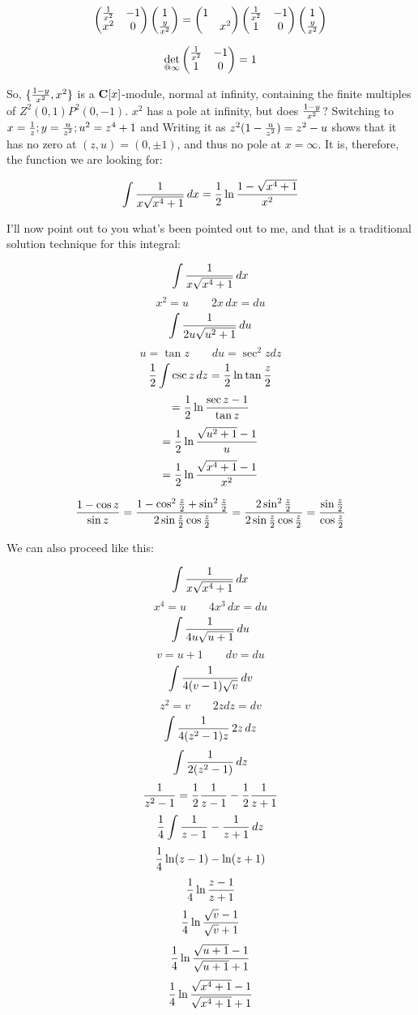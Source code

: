 $$\begin{pmatrix}
{1\over{x^2}} & -1 \cr
x^2 & 0\end{pmatrix} \begin{pmatrix}1 \cr {y\over{x^2}}\end{pmatrix} = \begin{pmatrix}1 & \cr & x^2\end{pmatrix}\begin{pmatrix}
{1\over{x^2}} & -1 \cr
1 & 0\end{pmatrix}
\begin{pmatrix}1 \cr {y\over{x^2}}\end{pmatrix} $$

$$\det_{@\infty}\begin{pmatrix}
{1\over{x^2}} & -1 \cr
1 & 0\end{pmatrix} = 1$$

So, $\{{{1-y}\over{x^2}}, x^2\}$ is a ${\bf C}[x]$-module, normal at
infinity, containing the finite multiples of $Z^2(0,1)P^2(0,-1)$.
$x^2$ has a pole at infinity, but does ${1-y}\over{x^2}$?
Switching to $x={1\over z}; y={u\over{z^2}}; u^2 = z^4 + 1$ and
Writing it as $z^2(1-{u\over{z^2}}) = z^2 - u$ shows that it has no
zero at $(z,u) = (0, \pm 1)$, and thus no pole at $x = \infty$.  It
is, therefore, the function we are looking for:

$$\int {1\over{x\sqrt{x^4+1}}} \, dx
   = {1\over2} \ln{{1-\sqrt{x^4+1}}\over{x^2}}$$

I'll now point out to you what's been pointed out to me, and that is a
traditional solution technique for this integral:

$$\int {1\over{x\sqrt{x^4+1}}} \, dx$$
$$x^2 = u \qquad 2 x\, dx = du$$
$$\int {1\over{2u\sqrt{u^2+1}}} \, du$$
$$u = \tan z \qquad du = \sec^2 z dz$$
$${1 \over 2} \int \csc z \, dz = {1\over 2} \ln \tan {z\over2}$$
$$={1\over2} \ln {{\sec z - 1}\over{\tan z}}$$
$$={1\over2} \ln {{\sqrt{u^2+1}-1}\over{u}}$$
$$={1\over2} \ln {{\sqrt{x^4+1}-1}\over{x^2}}$$

\vskip 0.5in

$${{1 - \cos z}\over{\sin z}} = {{1 - \cos^2 {z\over2} + \sin^2 {z\over2}}\over{2\sin{z\over2}\cos{z\over2}}} = {{2\sin^2 {z\over2}}\over{2\sin{z\over2}\cos{z\over2}}} = {{\sin {z\over2}}\over{\cos{z\over2}}} $$

\vfill\eject

We can also proceed like this:

$$\int {1\over{x\sqrt{x^4+1}}} \, dx$$
$$x^4 = u \qquad 4 x^3\, dx = du$$
$$\int {1\over{4u\sqrt{u+1}}} \, du$$
$$v = u + 1 \qquad dv = du$$
$$\int {1\over{4(v-1)\sqrt{v}}} \, dv$$
$$z^2 = v \qquad 2 z dz = dv$$
$$\int {1\over{4(z^2-1)z}} \, 2z\, dz$$
$$\int {1\over{2(z^2-1)}} \, dz$$
$${1\over{z^2-1}} = {1\over2}{1\over{z-1}} - {1\over2}{1\over{z+1}}$$
$${1\over4} \int {1\over{z-1}} - {1\over{z+1}} \, dz$$
$${1\over4} \ln (z-1) - \ln (z+1)$$
$${1\over4} \ln {{z-1}\over{z+1}}$$
$${1\over4} \ln {{\sqrt{v}-1}\over{\sqrt{v}+1}}$$
$${1\over4} \ln {{\sqrt{u+1}-1}\over{\sqrt{u+1}+1}}$$
$${1\over4} \ln {{\sqrt{x^4+1}-1}\over{\sqrt{x^4+1}+1}}$$

